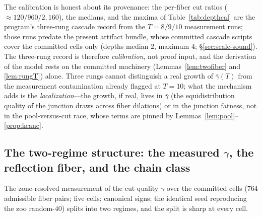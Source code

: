 The calibration is honest about its provenance: the per-fiber cut
ratios ($\approx120/960/2{,}160$), the medians, and the maxima of
Table~\ref{tab:depthcal} are the program's three-rung cascade record
from the $T=8/9/10$ measurement runs; those runs predate the present
artifact bundle, whose committed cascade scripts cover the committed
cells only (depths median $2$, maximum $4$; \S\ref{sec:scale-sound}).
The three-rung record is therefore \emph{calibration}, not proof input,
and the derivation of the model rests on the committed machinery
(Lemmas~\ref{lem:twofiber} and \ref{lem:rungT}) alone. Three rungs
cannot distinguish a real growth of $\bar\gamma(T)$ from the
measurement contamination already flagged at $T=10$; what the mechanism
adds is the \emph{localization}---the growth, if real, lives in
$\bar\gamma$ (the equidistribution quality of the junction draws across
fiber dilations) or in the junction fatness, not in the
pool-versus-cut race, whose terms are pinned by
Lemmas~\ref{lem:pool}--\ref{prop:kcanc}.

\subsection{The two-regime structure: the measured \texorpdfstring{$\gamma$}{gamma}, the reflection fiber, and the chain class}\label{sec:scale-h2}

The zone-resolved measurement of the cut quality $\gamma$ over the
committed cells ($764$ admissible fiber pairs; five cells; canonical
signs; the identical seed reproducing the zoo random-$40$) splits into
two regimes, and the split is sharp at every cell.

